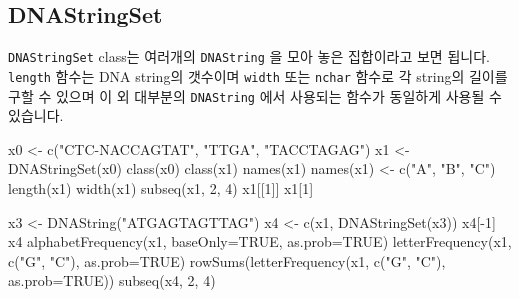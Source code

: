 \documentclass[
]{book}
\newenvironment{Shaded}{\begin{snugshade}}{\end{snugshade}}
\newcommand{\AttributeTok}[1]{\textcolor[rgb]{0.77,0.63,0.00}{#1}}
\newcommand{\ConstantTok}[1]{\textcolor[rgb]{0.00,0.00,0.00}{#1}}
\newcommand{\DecValTok}[1]{\textcolor[rgb]{0.00,0.00,0.81}{#1}}
\newcommand{\FunctionTok}[1]{\textcolor[rgb]{0.00,0.00,0.00}{#1}}
\newcommand{\NormalTok}[1]{#1}
\newcommand{\OtherTok}[1]{\textcolor[rgb]{0.56,0.35,0.01}{#1}}
\newcommand{\SpecialCharTok}[1]{\textcolor[rgb]{0.00,0.00,0.00}{#1}}
\newcommand{\StringTok}[1]{\textcolor[rgb]{0.31,0.60,0.02}{#1}}
\begin{document}
\hypertarget{dnastringset}{%
\subsection{DNAStringSet}\label{dnastringset}}

\texttt{DNAStringSet} class는 여러개의 \texttt{DNAString} 을 모아 놓은 집합이라고 보면 됩니다. \texttt{length} 함수는 DNA string의 갯수이며 \texttt{width} 또는 \texttt{nchar} 함수로 각 string의 길이를 구할 수 있으며 이 외 대부분의 \texttt{DNAString} 에서 사용되는 함수가 동일하게 사용될 수 있습니다.

\begin{Shaded}
\begin{Highlighting}[]
\NormalTok{x0 }\OtherTok{\textless{}{-}} \FunctionTok{c}\NormalTok{(}\StringTok{"CTC{-}NACCAGTAT"}\NormalTok{, }\StringTok{"TTGA"}\NormalTok{, }\StringTok{"TACCTAGAG"}\NormalTok{)}
\NormalTok{x1 }\OtherTok{\textless{}{-}} \FunctionTok{DNAStringSet}\NormalTok{(x0)}
\FunctionTok{class}\NormalTok{(x0)}
\FunctionTok{class}\NormalTok{(x1)}
\FunctionTok{names}\NormalTok{(x1)}
\FunctionTok{names}\NormalTok{(x1) }\OtherTok{\textless{}{-}} \FunctionTok{c}\NormalTok{(}\StringTok{"A"}\NormalTok{, }\StringTok{"B"}\NormalTok{, }\StringTok{"C"}\NormalTok{)}
\FunctionTok{length}\NormalTok{(x1)}
\FunctionTok{width}\NormalTok{(x1)}
\FunctionTok{subseq}\NormalTok{(x1, }\DecValTok{2}\NormalTok{, }\DecValTok{4}\NormalTok{)}
\NormalTok{x1[[}\DecValTok{1}\NormalTok{]]}
\NormalTok{x1[}\DecValTok{1}\NormalTok{]}


\NormalTok{x3 }\OtherTok{\textless{}{-}} \FunctionTok{DNAString}\NormalTok{(}\StringTok{"ATGAGTAGTTAG"}\NormalTok{)}
\NormalTok{x4 }\OtherTok{\textless{}{-}} \FunctionTok{c}\NormalTok{(x1, }\FunctionTok{DNAStringSet}\NormalTok{(x3))}
\NormalTok{x4[}\SpecialCharTok{{-}}\DecValTok{1}\NormalTok{]}
\NormalTok{x4}
\FunctionTok{alphabetFrequency}\NormalTok{(x1, }\AttributeTok{baseOnly=}\ConstantTok{TRUE}\NormalTok{, }\AttributeTok{as.prob=}\ConstantTok{TRUE}\NormalTok{)}
\FunctionTok{letterFrequency}\NormalTok{(x1, }\FunctionTok{c}\NormalTok{(}\StringTok{"G"}\NormalTok{, }\StringTok{"C"}\NormalTok{), }\AttributeTok{as.prob=}\ConstantTok{TRUE}\NormalTok{)}
\FunctionTok{rowSums}\NormalTok{(}\FunctionTok{letterFrequency}\NormalTok{(x1, }\FunctionTok{c}\NormalTok{(}\StringTok{"G"}\NormalTok{, }\StringTok{"C"}\NormalTok{), }\AttributeTok{as.prob=}\ConstantTok{TRUE}\NormalTok{))}
\FunctionTok{subseq}\NormalTok{(x4, }\DecValTok{2}\NormalTok{, }\DecValTok{4}\NormalTok{)}
\end{Highlighting}
\end{Shaded}
\end{document}
